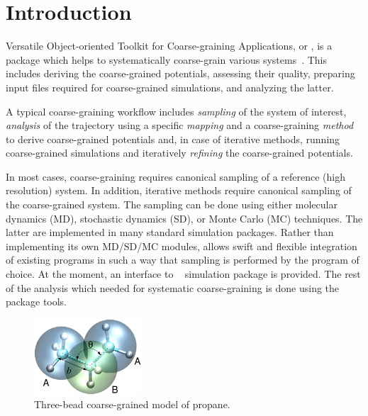 \chapter{Introduction}


Versatile Object-oriented Toolkit for Coarse-graining Applications, or \votca, is a package which helps to systematically coarse-grain various systems~\cite{Ruehle:2009.a}. This includes  deriving the coarse-grained potentials, assessing their quality, preparing input files required for coarse-grained simulations, and analyzing the latter.

A typical coarse-graining workflow includes {\em sampling} of the system of interest, {\em analysis} of the trajectory using a specific {\em mapping} and a coarse-graining {\em method} to derive coarse-grained potentials and, in case of iterative methods, running coarse-grained simulations and iteratively {\em refining} the coarse-grained potentials.

In most cases, coarse-graining requires canonical sampling of a reference (high resolution) system. In addition, iterative methods require canonical sampling of the coarse-grained system. The sampling can be done using either molecular dynamics (MD), stochastic dynamics (SD), or Monte Carlo (MC) techniques. The latter are implemented in many standard simulation packages. Rather than implementing its own MD/SD/MC modules, \votca allows swift and flexible integration of existing  programs in such a way that sampling is performed by the program of choice. At the moment, an interface to \gromacs~\cite{gromacs4} simulation package is provided. The rest of the analysis which needed for systematic coarse-graining is done using the package tools.

\begin{figure}
 \includegraphics[width=4cm]{fig/propane}
 \caption{\small Three-bead coarse-grained model of propane.
 \label{fig:intro:propane}
}
\end{figure}

